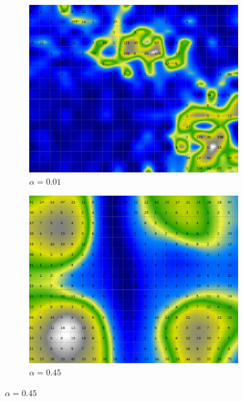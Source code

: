 \documentclass{acm_proc_article-sp}
\begin{document}
\begin{figure}
\centering
    \centering
    \begin{subfigure}[b]{0.24\linewidth}
        \includegraphics[width=\linewidth]{img/wine-20x16-smoothed-data-histogram-alpha-0,01-f-50}
        \caption{$\alpha=0.01$}
        \label{fig:wine-20x16-smoothed-data-histogram-alpha-0,01-f-50}
    \end{subfigure}
    \begin{subfigure}[b]{0.24\linewidth}
        \includegraphics[width=\linewidth]{img/wine-20x16-smoothed-data-histogram-alpha-0,45-f-50}
        \caption{$\alpha=0.45$}

\end{subfigure}
\end{figure}
\end{document}
